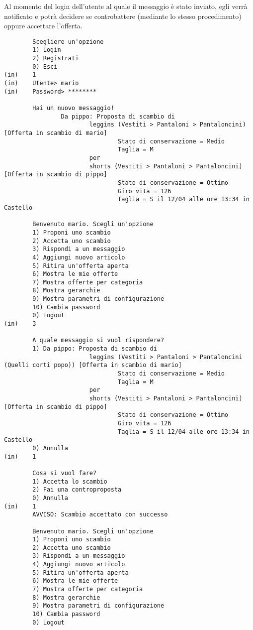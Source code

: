 Al momento del login dell'utente al quale il messaggio è stato inviato, egli verrà notificato e potrà decidere se controbattere (mediante lo stesso procedimento) oppure accettare l'offerta.

\begin{lstlisting}
        Scegliere un'opzione
        1) Login
        2) Registrati
        0) Esci
(in)    1
(in)    Utente> mario
(in)    Password> ********

        Hai un nuovo messaggio!
                Da pippo: Proposta di scambio di
                        leggins (Vestiti > Pantaloni > Pantaloncini) [Offerta in scambio di mario]
                                Stato di conservazione = Medio
                                Taglia = M
                        per
                        shorts (Vestiti > Pantaloni > Pantaloncini) [Offerta in scambio di pippo]
                                Stato di conservazione = Ottimo
                                Giro vita = 126
                                Taglia = S il 12/04 alle ore 13:34 in Castello

        Benvenuto mario. Scegli un'opzione
        1) Proponi uno scambio
        2) Accetta uno scambio
        3) Rispondi a un messaggio
        4) Aggiungi nuovo articolo
        5) Ritira un'offerta aperta
        6) Mostra le mie offerte
        7) Mostra offerte per categoria
        8) Mostra gerarchie
        9) Mostra parametri di configurazione
        10) Cambia password
        0) Logout
(in)    3

        A quale messaggio si vuol rispondere?
        1) Da pippo: Proposta di scambio di
                        leggins (Vestiti > Pantaloni > Pantaloncini (Quelli corti popo)) [Offerta in scambio di mario]
                                Stato di conservazione = Medio
                                Taglia = M
                        per
                        shorts (Vestiti > Pantaloni > Pantaloncini) [Offerta in scambio di pippo]
                                Stato di conservazione = Ottimo
                                Giro vita = 126
                                Taglia = S il 12/04 alle ore 13:34 in Castello
        0) Annulla
(in)    1

        Cosa si vuol fare?
        1) Accetta lo scambio
        2) Fai una controproposta
        0) Annulla
(in)    1
        AVVISO: Scambio accettato con successo

        Benvenuto mario. Scegli un'opzione
        1) Proponi uno scambio
        2) Accetta uno scambio
        3) Rispondi a un messaggio
        4) Aggiungi nuovo articolo
        5) Ritira un'offerta aperta
        6) Mostra le mie offerte
        7) Mostra offerte per categoria
        8) Mostra gerarchie
        9) Mostra parametri di configurazione
        10) Cambia password
        0) Logout
\end{lstlisting}

